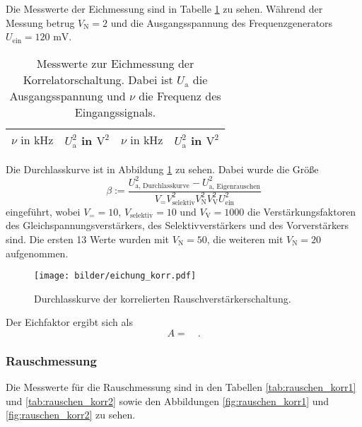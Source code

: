 		Die Messwerte der Eichmessung sind in Tabelle
		\ref{tab:eichung_korr} zu sehen. Während der Messung
		betrug $V_\text{N}=2$ und die Ausgangsspannung des
		Frequenzgenerators $U_\text{ein} = 120 \text{ mV}$.

		\begin{table}[h]
		\centering
			\begin{tabular}{cccc}
				\toprule \midrule
				$\nu \text{ in} \text{ kHz}$ & $U^2_\text{a}$ in $\text{V}^2$ &
				$\nu \text{ in} \text{ kHz}$ & $U^2_\text{a}$ in $\text{V}^2$
				\\
				\midrule
				
				\midrule \bottomrule
			\end{tabular}
			\caption{Messwerte zur Eichmessung der Korrelatorschaltung. Dabei ist $U_\text{a}$
			die
			Ausgangsspannung und $\nu$ die Frequenz des
			Eingangssignals. }
			\label{tab:eichung_korr}
		\end{table}

		Die Durchlasskurve ist in Abbildung \ref{fig:eichung_korr} zu sehen. Dabei wurde die Größe
		\begin{equation}
		\beta := \frac{U^2_\text{a, Durchlasskurve}-U_\text{a, Eigenrauschen}^2}
		{V_= V_\text{selektiv}^2 V_\text{N}^2 V_\text{V}^2  U^2_\text{ein}}
		\end{equation}
		eingeführt, wobei $V_= =10$, $V_\text{selektiv}=10$ und $V_\text{V}=1000$
		die Verstärkungsfaktoren des Gleichspannungsverstärkers, des Selektivverstärkers und des
		Vorverstärkers sind. Die ersten 13 Werte wurden mit $V_\text{N}=50$, die weiteren
		mit $V_\text{N}=20$ aufgenommen.

		\begin{figure}
			\centering
			\texttt{[image: bilder/eichung\_korr.pdf]}
			\caption{Durchlasskurve der korrelierten Rauschverstärkerschaltung.}
			\label{fig:eichung_korr}
		\end{figure}

		Der Eichfaktor ergibt sich als
		\begin{equation}
			A =    \quad .
		\end{equation}


	\clearpage
	\subsubsection{Rauschmessung}
		Die Messwerte für die Rauschmessung sind in den Tabellen \ref{tab:rauschen_korr1}
		und \ref{tab:rauschen_korr2} sowie den Abbildungen
		\ref{fig:rauschen_korr1} und \ref{fig:rauschen_korr2} zu sehen.


